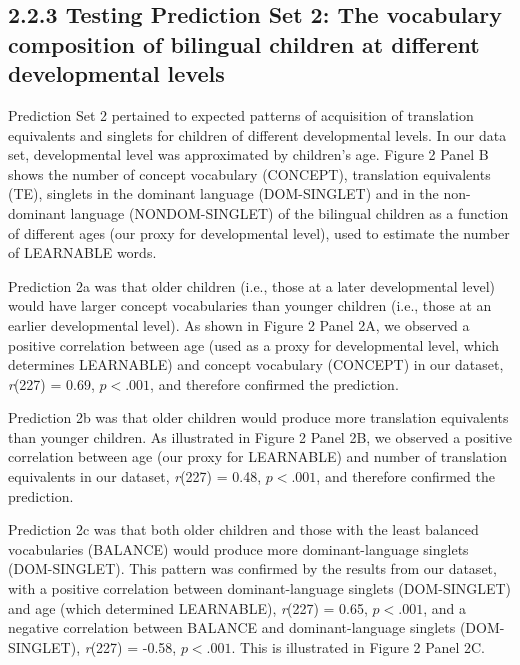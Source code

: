 \documentclass[
  english,
  ,man,floatsintext]{apa6}
\begin{document}
\hypertarget{testing-prediction-set-2-the-vocabulary-composition-of-bilingual-children-at-different-developmental-levels}{%
\subsection{2.2.3 Testing Prediction Set 2: The vocabulary composition of bilingual children at different developmental levels}\label{testing-prediction-set-2-the-vocabulary-composition-of-bilingual-children-at-different-developmental-levels}}

Prediction Set 2 pertained to expected patterns of acquisition of translation equivalents and singlets for children of different developmental levels. In our data set, developmental level was approximated by children's age. Figure 2 Panel B shows the number of concept vocabulary (CONCEPT), translation equivalents (TE), singlets in the dominant language (DOM-SINGLET) and in the non-dominant language (NONDOM-SINGLET) of the bilingual children as a function of different ages (our proxy for developmental level), used to estimate the number of LEARNABLE words.

Prediction 2a was that older children (i.e., those at a later developmental level) would have larger concept vocabularies than younger children (i.e., those at an earlier developmental level). As shown in Figure 2 Panel 2A, we observed a positive correlation between age (used as a proxy for developmental level, which determines LEARNABLE) and concept vocabulary (CONCEPT) in our dataset, \emph{r}(227) = 0.69, \(p < .001\), and therefore confirmed the prediction.

Prediction 2b was that older children would produce more translation equivalents than younger children. As illustrated in Figure 2 Panel 2B, we observed a positive correlation between age (our proxy for LEARNABLE) and number of translation equivalents in our dataset, \emph{r}(227) = 0.48, \(p < .001\), and therefore confirmed the prediction.

Prediction 2c was that both older children and those with the least balanced vocabularies (BALANCE) would produce more dominant-language singlets (DOM-SINGLET). This pattern was confirmed by the results from our dataset, with a positive correlation between dominant-language singlets (DOM-SINGLET) and age (which determined LEARNABLE), \emph{r}(227) = 0.65, \(p < .001\), and a negative correlation between BALANCE and dominant-language singlets (DOM-SINGLET), \emph{r}(227) = -0.58, \(p < .001\). This is illustrated in Figure 2 Panel 2C.
\end{document}
